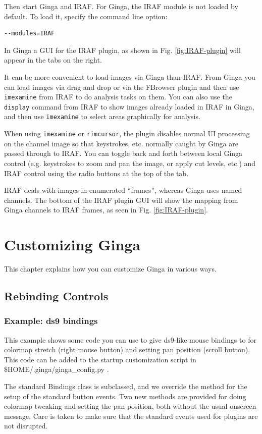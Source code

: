 \documentclass[11pt]{report}
\begin{document}
Then start Ginga and IRAF.  For Ginga, the IRAF module is not loaded by
default.  To load it, specify the command line option:
\begin{verbatim}
--modules=IRAF
\end{verbatim}
In Ginga a GUI for the IRAF plugin, as shown in
Fig. \ref{fig:IRAF-plugin} will appear in the tabs on the right.

It can be more convenient to load images via Ginga than IRAF.  From
Ginga you can load images via drag and drop or via the FBrowser 
plugin and then use {\tt imexamine} from IRAF to do analysis tasks on
them.  You can also use the {\tt display} command from IRAF to show
images already loaded in IRAF in Ginga, and then use {\tt imexamine} to
select areas graphically for analysis.

When using {\tt imexamine} or {\tt rimcursor}, the plugin disables
normal UI processing on the channel image so that keystrokes,
etc. normally caught by Ginga are passed through to IRAF.  You can
toggle back and forth between local Ginga control (e.g. keystrokes to
zoom and pan the image, or apply cut levels, etc.) and IRAF control
using the radio buttons at the top of the tab.   

IRAF deals with images in enumerated ``frames'', whereas Ginga uses
named channels.  The bottom of the IRAF plugin GUI will show the mapping
from Ginga channels to IRAF frames, as seen in Fig. \ref{fig:IRAF-plugin}.

\chapter{Customizing Ginga}
\label{ch:customizing}
This chapter explains how you can customize Ginga in various ways.

\section{Rebinding Controls}
\label{sec:bindings}

\subsection{Example: ds9 bindings}
This example shows some code you can use to give ds9-like mouse bindings
to for colormap stretch (right mouse button) and setting pan position
(scroll button). This code can be added to the startup customization
script in \$HOME/.ginga/ginga\_config.py .

The standard Bindings class is subclassed, and we override the method
for the setup of the standard button events.  Two new methods are
provided for doing colormap tweaking and setting the pan position, both
without the usual onscreen message.  Care is taken to make sure that the
standard events used for plugins are not disrupted.
\end{document}
